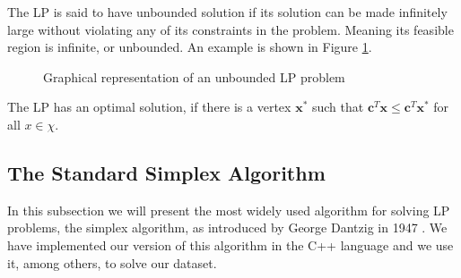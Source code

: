 The LP is said to have unbounded solution if its
solution can be made infinitely large without violating any of its constraints in the problem.
Meaning its feasible region is infinite, or unbounded. An example is shown in Figure \ref{unbounded}.

\begin{figure}[h]
    \centering
    \caption{Graphical representation of an unbounded LP problem}
    \label{unbounded}
\end{figure}

The LP has an optimal solution, if there is a vertex \( \mathbf{x^*} \) such that
$\mathbf{c}^T \mathbf{x} \leq \mathbf{c}^T \mathbf{x^*} $ for all $x \in \chi$.

\subsection{The Standard Simplex Algorithm}
In this subsection we will present the most widely used algorithm for solving
LP problems, the simplex algorithm, as introduced by George Dantzig in 1947
\parencite{dantzig1990origins}. We have implemented our version of this algorithm
in the C++ language and we use it, among others, to solve our dataset.

